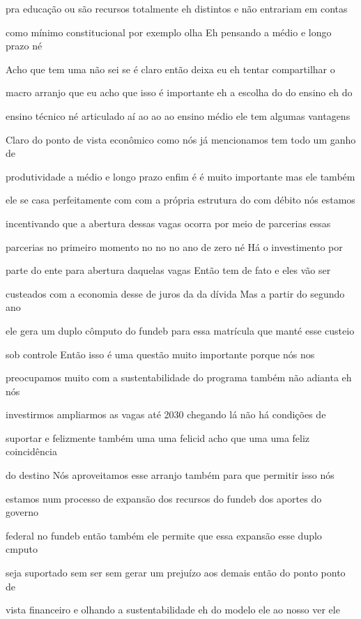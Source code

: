 \documentclass[a4paper,12pt]{article}
\begin{document}
pra educação ou são recursos totalmente eh distintos e não entrariam em contas

como mínimo constitucional por exemplo olha Eh pensando a médio e longo prazo né

Acho que tem uma não sei se é claro então deixa eu eh tentar compartilhar o

macro arranjo que eu acho que isso é importante eh a escolha do do ensino eh do

ensino técnico né articulado aí ao ao ao ensino médio ele tem algumas vantagens

Claro do ponto de vista econômico como nós já mencionamos tem todo um ganho de

produtividade a médio e longo prazo enfim é é muito importante mas ele também

ele se casa perfeitamente com com a própria estrutura do com débito nós estamos

incentivando que a abertura dessas vagas ocorra por meio de parcerias essas

parcerias no primeiro momento no no no ano de zero né Há o investimento por

parte do ente para abertura daquelas vagas Então tem de fato e eles vão ser

custeados com a economia desse de juros da da dívida Mas a partir do segundo ano

ele gera um duplo cômputo do fundeb para essa matrícula que manté esse custeio

sob controle Então isso é uma questão muito importante porque nós nos

preocupamos muito com a sustentabilidade do programa também não adianta eh nós

investirmos ampliarmos as vagas até 2030 chegando lá não há condições de

suportar e felizmente também uma uma felicid acho que uma uma feliz coincidência

do destino Nós aproveitamos esse arranjo também para que permitir isso nós

estamos num processo de expansão dos recursos do fundeb dos aportes do governo

federal no fundeb então também ele permite que essa expansão esse duplo cmputo

seja suportado sem ser sem gerar um prejuízo aos demais então do ponto ponto de

vista financeiro e olhando a sustentabilidade eh do modelo ele ao nosso ver ele
\end{document}
